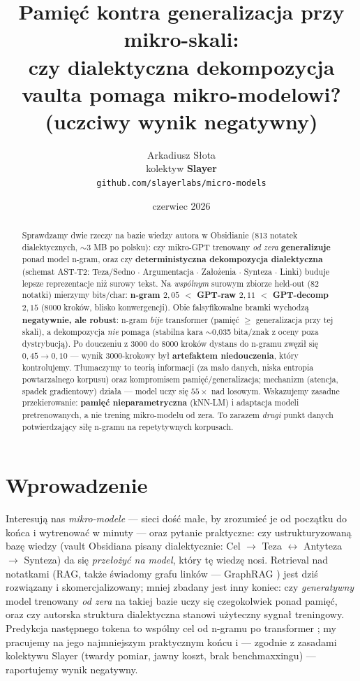\documentclass[11pt]{article}
\title{Pamięć kontra generalizacja przy mikro-skali:\\ czy dialektyczna dekompozycja vaulta pomaga mikro-modelowi?\\ \large (uczciwy wynik negatywny)}
\author{Arkadiusz Słota \\ kolektyw \textbf{Slayer} \\ \texttt{github.com/slayerlabs/micro-models}}
\date{czerwiec 2026}
\begin{document}
\maketitle

\begin{abstract}
Sprawdzamy dwie rzeczy na bazie wiedzy autora w Obsidianie (813 notatek dialektycznych, $\sim$3 MB po polsku):
czy mikro-GPT trenowany \emph{od zera} \textbf{generalizuje} ponad model n-gram, oraz czy
\textbf{deterministyczna dekompozycja dialektyczna} (schemat AST-T2: Teza/Sedno $\cdot$ Argumentacja $\cdot$
Założenia $\cdot$ Synteza $\cdot$ Linki) buduje lepsze reprezentacje niż surowy tekst. Na \emph{wspólnym} surowym
zbiorze held-out (82 notatki) mierzymy bits/char: \textbf{n-gram $2{,}05$ $<$ GPT-raw $2{,}11$ $<$ GPT-decomp
$2{,}15$} (8000 kroków, blisko konwergencji). Obie falsyfikowalne bramki wychodzą \textbf{negatywnie, ale
robust}: n-gram \emph{bije} transformer (pamięć $\geq$ generalizacja przy tej skali), a dekompozycja \emph{nie}
pomaga (stabilna kara $\sim$0{,}035 bita/znak z oceny poza dystrybucją). Po douczeniu z 3000 do 8000 kroków dystans
do n-gramu zwęził się $0{,}45\!\to\!0{,}10$ --- wynik 3000-krokowy był \textbf{artefaktem niedouczenia}, który
kontrolujemy. Tłumaczymy to teorią informacji (za mało danych, niska entropia powtarzalnego korpusu) oraz
kompromisem pamięć/generalizacja; mechanizm (atencja, spadek gradientowy) działa --- model uczy się $55\times$ nad
losowym. Wskazujemy zasadne przekierowanie: \textbf{pamięć nieparametryczna} (kNN-LM) i adaptacja modeli
pretrenowanych, a nie trening mikro-modelu od zera. To zarazem \emph{drugi} punkt danych potwierdzający siłę
n-gramu na repetytywnych korpusach.
\end{abstract}

\section{Wprowadzenie}
Interesują nas \emph{mikro-modele} --- sieci dość małe, by zrozumieć je od początku do końca i wytrenować w
minuty --- oraz pytanie praktyczne: czy ustrukturyzowaną bazę wiedzy (vault Obsidiana pisany dialektycznie:
Cel $\to$ Teza $\leftrightarrow$ Antyteza $\to$ Synteza) da się \emph{przełożyć na model}, który tę wiedzę nosi.
Retrieval nad notatkami (RAG, także świadomy grafu linków --- GraphRAG \cite{graphrag}) jest dziś rozwiązany i
skomercjalizowany; mniej zbadany jest inny koniec: czy \emph{generatywny} model trenowany \emph{od zera} na takiej
bazie uczy się czegokolwiek ponad pamięć, oraz czy autorska struktura dialektyczna stanowi użyteczny sygnał
treningowy. Predykcja następnego tokena to wspólny cel od n-gramu po transformer \cite{nplm,vaswani}; my pracujemy
na jego najmniejszym praktycznym końcu i --- zgodnie z zasadami kolektywu Slayer (twardy pomiar, jawny koszt, brak
benchmaxxingu) --- raportujemy wynik negatywny.
\end{document}
